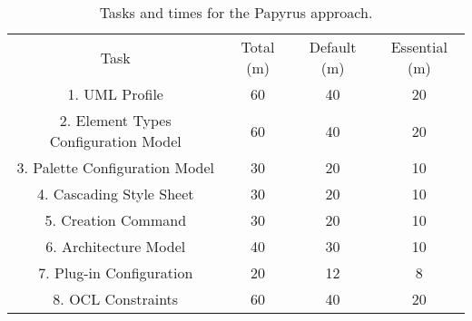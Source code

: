\begin{table}[ht!]
	\centering
	\setlength{\tabcolsep}{3.5pt} 
	\begin{tabular}{|c|c|c|c|}
		Task & Total (m) & Default (m) & Essential (m) \\ 
		1. UML Profile & 60 & 40 & 20 \\
		2. Element Types Configuration Model & 60 & 40 & 20 \\
		3. Palette Configuration Model & 30 & 20 & 10 \\
		4. Cascading Style Sheet & 30 & 20 & 10 \\
		5. Creation Command & 30 & 20 & 10 \\
		6. Architecture Model & 40 & 30 & 10 \\
		7. Plug-in Configuration & 20 & 12 & 8 \\
		8. OCL Constraints & 60 & 40 & 20 \\
	\end{tabular}
	\caption{Tasks and times for the Papyrus approach.}
	\label{tab:manual}
\end{table}


